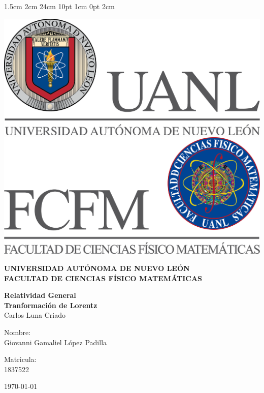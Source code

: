 \documentclass[12pt,letterpaper]{report}
\begin{document}
\setmargins{2.5cm}      
{1.5cm}                     
{2cm}  
{24cm}                    
{10pt}                          
{1cm}                          
{0pt}                             
{2cm}
\begin{titlepage}
\begin{center}
\includegraphics[scale=0.40]{../../Logos/uanl.png} 
\hspace{2.5cm}
\includegraphics[scale=0.40]{../../Logos/fcfm.png}
\end{center}
\vspace{2cm}
\begin{center}
\textbf{
UNIVERSIDAD AUTÓNOMA DE NUEVO LEÓN\\
FACULTAD DE CIENCIAS
    FÍSICO MATEMÁTICAS}\\
\vspace*{2cm}
\begin{large}
\vspace{1cm}
\large{\textbf{Relatividad General}}\\
\textbf{Tranformación de Lorentz}\\
Carlos Luna Criado\\
\end{large}
\vspace{3.5cm}
\begin{minipage}{0.6\linewidth}
\vspace{0.5cm}
\changefontsizes{14pt}
Nombre:\\
Giovanni Gamaliel López Padilla\\
\end{minipage}
\begin{minipage}{0.2\linewidth}
\changefontsizes{14pt}
Matricula:\\
1837522
\end{minipage}
\end{center}
\vspace{4cm}
\begin{flushright}
\today
\end{flushright}
\end{titlepage}
\end{document}
